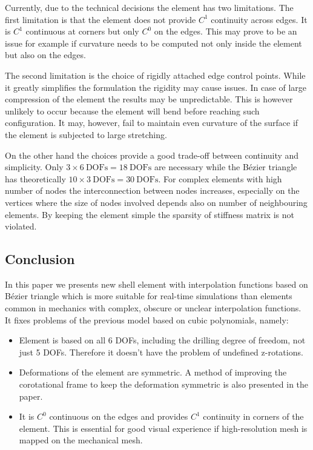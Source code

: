 \documentclass{egpubl}
\begin{document}
Currently, due to the technical decisions the element has two limitations.
The first limitation is that the element does not provide $C^1$ continuity
across edges. It is $C^1$ continuous at corners but only $C^0$ on the
edges. This may prove to be an issue for example if curvature needs to be
computed not only inside the element but also on the edges.

The second limitation is the choice of rigidly attached edge control
points. While it greatly simplifies the formulation the rigidity may cause
issues. In case of large compression of the element the results may be
unpredictable. This is however unlikely to occur because the element will
bend before reaching such configuration. It may, however, fail to maintain
even curvature of the surface if the element is subjected to large
stretching.

On the other hand the choices provide a good trade-off between continuity
and simplicity. Only $ 3 \times 6~\mathrm{DOFs} = 18~\mathrm{DOFs}$ are
necessary while the B\'ezier triangle has theoretically $ 10 \times
3~\mathrm{DOFs} = 30~\mathrm{DOFs}$. For complex elements with high number
of nodes the interconnection between nodes increases, especially on the
vertices where the size of nodes involved depends also on number of
neighbouring elements. By keeping the element simple the sparsity of
stiffness matrix is not violated.


\subsection{Conclusion} %

In this paper we presents new shell element with interpolation functions
based on B\'ezier triangle which is more suitable for real-time simulations than elements common in mechanics with complex, obscure or unclear interpolation functions.
It fixes problems of the previous model \cite{Comas2010c} based on cubic polynomials, namely:

\begin{itemize}

    \item Element is based on all 6 DOFs, including the drilling degree of
        freedom, not just 5 DOFs. Therefore it doesn't have the problem of
        undefined z-rotations.

    \item Deformations of the element are symmetric. A method of improving
    the corotational frame to keep the deformation symmetric is also
    presented in the paper.

    \item It is $C^0$ continuous on the edges and provides $C^1$ continuity in
    corners of the element. This is essential for good visual experience if
    high-resolution mesh is mapped on the mechanical mesh.


\end{itemize}
\end{document}
